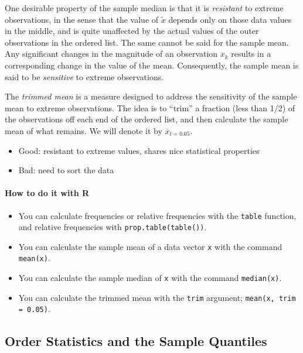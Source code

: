 \documentclass[captions=tableheading]{scrbook}
\begin{document}
One desirable property of the sample median is that it is \emph{resistant} to extreme observations, in the sense that the value of \(\tilde{x}\) depends only on those data values in the middle, and is quite unaffected by the actual values of the outer observations in the ordered list. The same cannot be said for the sample mean. Any significant changes in the magnitude of an observation \(x_{k}\) results in a corresponding change in the value of the mean. Consequently, the sample mean is said to be \emph{sensitive} to extreme observations.

The \emph{trimmed mean} is a measure designed to address the sensitivity of the sample mean to extreme observations. The idea is to ``trim'' a fraction (less than 1/2) of the observations off each end of the ordered list, and then calculate the sample mean of what remains. We will denote it by \(\overline{x}_{t=0.05}\).

\begin{itemize}
\item Good: resistant to extreme values, shares nice statistical properties
\item Bad: need to sort the data
\end{itemize}


\paragraph*{How to do it with \textsf{R}}

\begin{itemize}
\item You can calculate frequencies or relative frequencies with the \texttt{table} function, and relative frequencies with \texttt{prop.table(table())}. \item You can calculate the sample mean of a data vector \texttt{x} with the command \texttt{mean(x)}.
\item You can calculate the sample median of \texttt{x} with the command \texttt{median(x)}. \item You can calculate the trimmed mean with the \texttt{trim} argument; \texttt{mean(x, trim = 0.05)}.
\end{itemize}
\subsection{Order Statistics and the Sample Quantiles}
\label{sec-3-3-3}

\label{sub:Order-Statistics-and}
\end{document}

